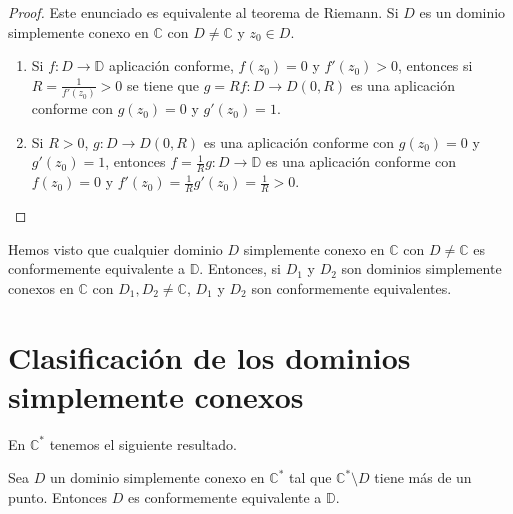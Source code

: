 \begin{proof}
    Este enunciado es equivalente al teorema de Riemann.
    Si $D$ es un dominio simplemente conexo en $\mathbb{C}$ con $D \neq \mathbb{C}$ y $z_0 \in D$.
    \begin{enumerate}
        \item Si $f: D \to \mathbb{D}$ aplicación conforme, $f(z_0) = 0$ y $f'(z_0) > 0$, entonces si $R = \frac{1}{f'(z_0)} > 0$ se tiene que $g = Rf: D \to D(0, R)$ es una aplicación conforme con $g(z_0) = 0$ y $g'(z_0) = 1$.
        \item Si $R > 0$, $g: D \to D(0, R)$ es una aplicación conforme con $g(z_0) = 0$ y $g'(z_0) = 1$, entonces $f = \frac{1}{R}g: D \to \mathbb{D}$ es una aplicación conforme con $f(z_0) = 0$ y $f'(z_0) = \frac{1}{R}g'(z_0) = \frac{1}{R} > 0$.
    \end{enumerate}
\end{proof}

\begin{remark}
    Hemos visto que cualquier dominio $D$ simplemente conexo en $\mathbb{C}$ con $D \neq \mathbb{C}$ es conformemente equivalente a $\mathbb{D}$.
    Entonces, si $D_1$ y $D_2$ son dominios simplemente conexos en $\mathbb{C}$ con $D_1, D_2 \neq \mathbb{C}$, $D_1$ y $D_2$ son conformemente equivalentes.
\end{remark}

\section{Clasificación de los dominios simplemente conexos}

En $\mathbb{C}^\ast$ tenemos el siguiente resultado.

\begin{theorem}
    Sea $D$ un dominio simplemente conexo en $\mathbb{C}^\ast$ tal que $\mathbb{C}^\ast \setminus D$ tiene más de un punto.
    Entonces $D$ es conformemente equivalente a $\mathbb{D}$.
\end{theorem}

